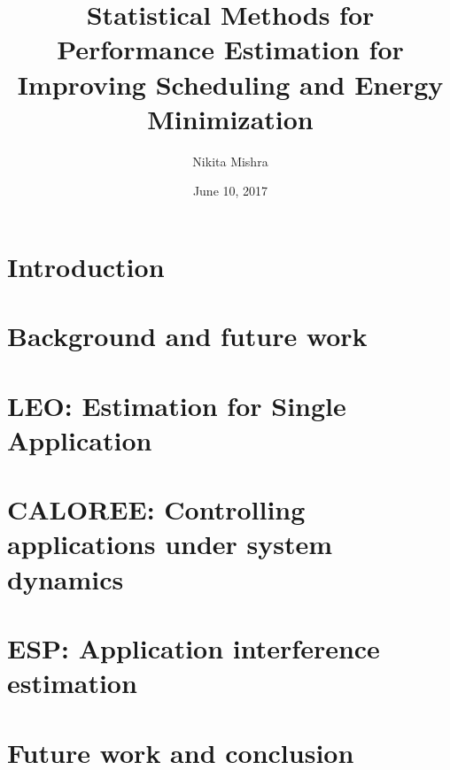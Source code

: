 \documentclass{ucetd}
\title{Statistical Methods for Performance Estimation for Improving Scheduling and Energy Minimization}
\author{Nikita Mishra}
\date{June 10, 2017}
\begin{document}
\maketitle

\makecopyright
\makededication
\makeepigraph
\tableofcontents
\listoffigures
\listoftables
\graphicspath{{figures/}} %

\acknowledgments


\mainmatter

\chapter{Introduction}




\chapter{Background and future work}




\chapter{LEO: Estimation for Single Application}








\chapter{CALOREE: Controlling applications under system dynamics}






\chapter{ESP: Application interference estimation}








\chapter{Future work and conclusion}




\makebibliography
%
%
\end{document}

